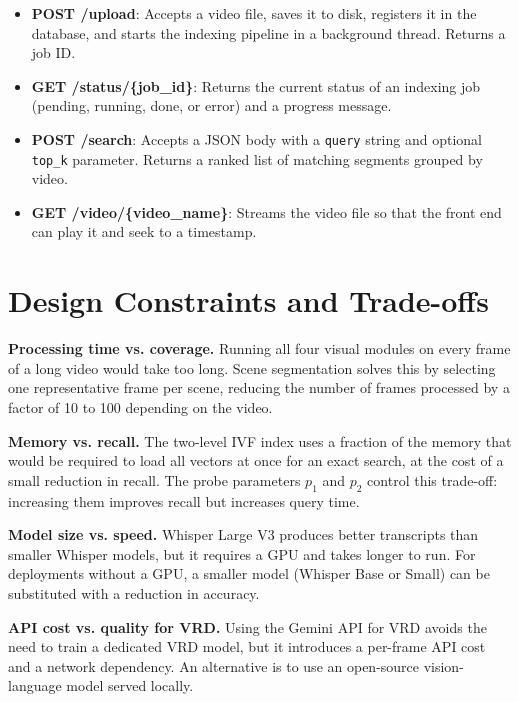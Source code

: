 \documentclass[12pt, a4paper]{report}
\begin{document}
\begin{itemize}
  \item \textbf{POST /upload}: Accepts a video file, saves it to disk,
    registers it in the database, and starts the indexing pipeline in a
    background thread. Returns a job ID.
  \item \textbf{GET /status/\{job\_id\}}: Returns the current status of
    an indexing job (pending, running, done, or error) and a progress
    message.
  \item \textbf{POST /search}: Accepts a JSON body with a \texttt{query}
    string and optional \texttt{top\_k} parameter. Returns a ranked list
    of matching segments grouped by video.
  \item \textbf{GET /video/\{video\_name\}}: Streams the video file so
    that the front end can play it and seek to a timestamp.
\end{itemize}

\section{Design Constraints and Trade-offs}

\textbf{Processing time vs. coverage.} Running all four visual modules
on every frame of a long video would take too long. Scene segmentation
solves this by selecting one representative frame per scene, reducing
the number of frames processed by a factor of 10 to 100 depending on
the video.

\textbf{Memory vs. recall.} The two-level IVF index uses a fraction of
the memory that would be required to load all vectors at once for an
exact search, at the cost of a small reduction in recall. The probe
parameters $p_1$ and $p_2$ control this trade-off: increasing them
improves recall but increases query time.

\textbf{Model size vs. speed.} Whisper Large V3 produces better transcripts
than smaller Whisper models, but it requires a GPU and takes longer to run.
For deployments without a GPU, a smaller model (Whisper Base or Small) can
be substituted with a reduction in accuracy.

\textbf{API cost vs. quality for VRD.} Using the Gemini API for VRD avoids
the need to train a dedicated VRD model, but it introduces a per-frame
API cost and a network dependency. An alternative is to use an open-source
vision-language model served locally.
\end{document}
